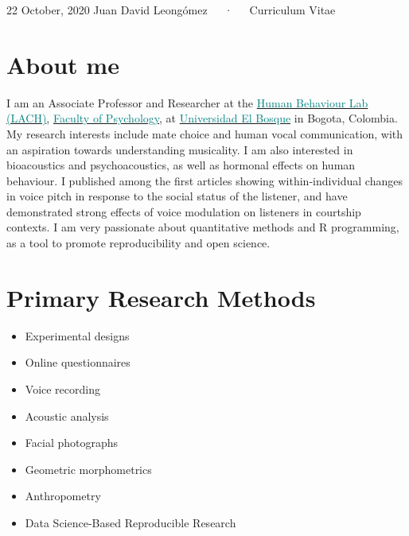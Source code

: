 \documentclass[11pt, a4paper]{awesome-cv}
\providecommand{\tightlist}{%
	\setlength{\itemsep}{0pt}\setlength{\parskip}{0pt}}
\begin{document}
\makecvheader

\makecvfooter
  {22 October, 2020}
    {Juan David Leongómez~~~·~~~Curriculum Vitae}
  {\thepage}





\hypertarget{about-me}{%
\section{About me}\label{about-me}}

I am an Associate Professor and Researcher at the \href{https://sites.google.com/unbosque.edu.co/lach-es}{\textcolor{teal}{Human Behaviour Lab (LACH)}}, \href{https://www.uelbosque.edu.co/psicologia}{\textcolor{teal}{Faculty of Psychology}}, at \href{https://www.uelbosque.edu.co/}{\textcolor{teal}{Universidad El Bosque}} in Bogota, Colombia. My research interests include mate choice and human vocal communication, with an aspiration towards understanding musicality. I am also interested in bioacoustics and psychoacoustics, as well as hormonal effects on human behaviour. I published among the first articles showing within-individual changes in voice pitch in response to the social status of the listener, and have demonstrated strong effects of voice modulation on listeners in courtship contexts. I am very passionate about quantitative methods and R programming, as a tool to promote reproducibility and open science.

\hypertarget{primary-research-methods}{%
\section{Primary Research Methods}\label{primary-research-methods}}

\begin{itemize}
\tightlist
\item
  Experimental designs
\item
  Online questionnaires
\item
  Voice recording
\item
  Acoustic analysis
\item
  Facial photographs
\item
  Geometric morphometrics
\item
  Anthropometry
\item
  Data Science-Based Reproducible Research
\end{itemize}
\end{document}
